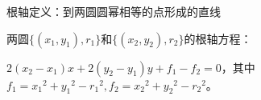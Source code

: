 根轴定义：到两圆圆幂相等的点形成的直线

两圆$\{(x_1, y_1), r_1\}$和$\{(x_2, y_2), r_2\}$的根轴方程：

$2(x_2 - x_1)x + 2(y_2 - y_1)y + f_1 - f_2 = 0$，其中$f_1 = {x_1} ^ 2 + {y_1} ^ 2 - {r_1} ^ 2, f_2 = {x_2} ^ 2 + {y_2} ^ 2 - {r_2} ^ 2$。
